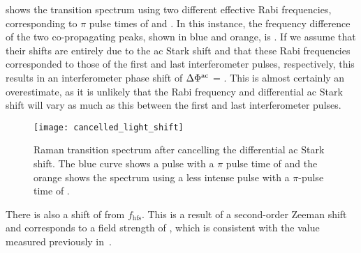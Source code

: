  shows the transition spectrum using two different effective Rabi
frequencies, corresponding to \(\pi\) pulse times of
 and
. In this instance, the frequency difference of the two
co-propagating peaks, shown in blue and orange, is
. If we assume that their shifts are entirely due
to the ac Stark shift and that these
Rabi frequencies
corresponded to those of
the first and last interferometer pulses, respectively, this results
in an interferometer phase shift of $\Delta \Phi^{\textnormal{ac}}$ =
. This is almost certainly an overestimate,
as it is unlikely that the Rabi frequency and differential ac Stark
shift will vary as much as this between the first and last
interferometer pulses.
\begin{figure}[htpb!]
  \centering
  \texttt{[image: cancelled\_light\_shift]}
  \caption[Raman transition spectrum after cancelling the differential
  ac Stark shift.]{Raman transition spectrum after cancelling the differential
    ac Stark shift. The blue curve shows a pulse with a \(\pi\) pulse
  time of  and the orange shows the
  spectrum using a less intense pulse with a $\pi$-pulse time of
.}
  \label{fig:cancelled_light_shift}
\end{figure}
There is also a shift of  from
\(f_\text{hfs}\).
This is a result of a
second-order Zeeman shift and corresponds to a field strength of
, which is consistent with the value measured
previously in~.

